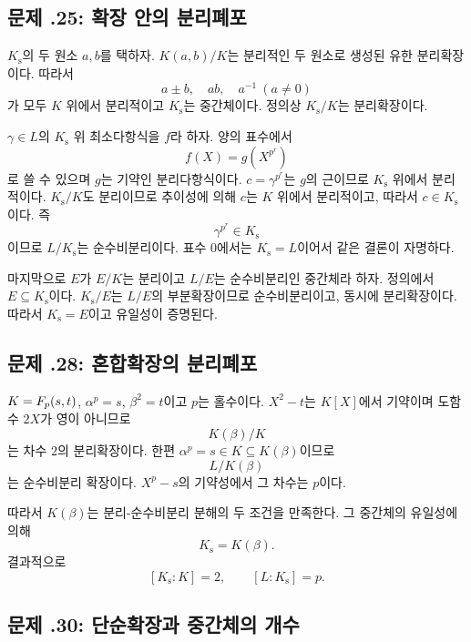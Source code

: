 \subsection*{문제 \thechapter.25: 확장 안의 분리폐포}

\begin{solution}
$K_{\mathrm s}$의 두 원소 $a,b$를 택하자. $K(a,b)/K$는 분리적인 두 원소로 생성된 유한 분리확장이다. 따라서
\[
  a\pm b,\quad ab,\quad a^{-1}\ (a\ne0)
\]
가 모두 $K$ 위에서 분리적이고 $K_{\mathrm s}$는 중간체이다. 정의상 $K_{\mathrm s}/K$는 분리확장이다.

$\gamma\in L$의 $K_{\mathrm s}$ 위 최소다항식을 $f$라 하자. 양의 표수에서
\[
  f(X)=g(X^{p^r})
\]
로 쓸 수 있으며 $g$는 기약인 분리다항식이다. $c=\gamma^{p^r}$는 $g$의 근이므로 $K_{\mathrm s}$ 위에서 분리적이다. $K_{\mathrm s}/K$도 분리이므로 추이성에 의해 $c$는 $K$ 위에서 분리적이고, 따라서 $c\in K_{\mathrm s}$이다. 즉
\[
  \gamma^{p^r}\in K_{\mathrm s}
\]
이므로 $L/K_{\mathrm s}$는 순수비분리이다. 표수 $0$에서는 $K_{\mathrm s}=L$이어서 같은 결론이 자명하다.

마지막으로 $E$가 $E/K$는 분리이고 $L/E$는 순수비분리인 중간체라 하자. 정의에서 $E\subseteq K_{\mathrm s}$이다. $K_{\mathrm s}/E$는 $L/E$의 부분확장이므로 순수비분리이고, 동시에 분리확장이다. 따라서 $K_{\mathrm s}=E$이고 유일성이 증명된다.
\end{solution}

\subsection*{문제 \thechapter.28: 혼합확장의 분리폐포}

\begin{solution}
$K=F_p(s,t)$, $\alpha^p=s$, $\beta^2=t$이고 $p$는 홀수이다. $X^2-t$는 $K[X]$에서 기약이며 도함수 $2X$가 영이 아니므로
\[
  K(\beta)/K
\]
는 차수 $2$의 분리확장이다. 한편 $\alpha^p=s\in K\subseteq K(\beta)$이므로
\[
  L/K(\beta)
\]
는 순수비분리 확장이다. $X^p-s$의 기약성에서 그 차수는 $p$이다.

따라서 $K(\beta)$는 분리-순수비분리 분해의 두 조건을 만족한다. 그 중간체의 유일성에 의해
\[
  K_{\mathrm s}=K(\beta).
\]
결과적으로
\[
  [K_{\mathrm s}:K]=2,
  \qquad
  [L:K_{\mathrm s}]=p.
\]
\end{solution}

\subsection*{문제 \thechapter.30: 단순확장과 중간체의 개수}

